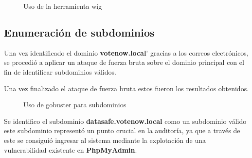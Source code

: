 \documentclass[a4paper]{article}
\begin{document}
\begin{figure}
  \begin{center}
    \setlength{\fboxrule}{0.8pt}
    \caption{Uso de la herramienta wig}
  \end{center}
\end{figure}
\vspace{0.4cm}


\subsection{Enumeración de subdominios}


Una vez identificado el dominio \textbf{votenow.local}' gracias a los correos electrónicos,
se procedió a aplicar un ataque de fuerza bruta sobre el dominio principal con el fin de
identificar subdominios válidos.\par
Una vez finalizado el ataque de fuerza bruta estos fueron los resultados obtenidos.

\begin{figure}[H]
  \begin{center}
    \setlength{\fboxrule}{0.8pt}
    \caption{Uso de gobuster para subdominios}
    \label{fig: Identifiedsubdomains}
  \end{center}
\end{figure}


Se identifico el subdominio \textbf{datasafe.votenow.local} como un subdominio válido
este subdominio representó un punto crucial en la auditoría, ya que a través de este
se consiguió ingresar al sistema mediante la explotación de una vulnerabilidad existente
en \textbf{PhpMyAdmin}.
\end{document}
